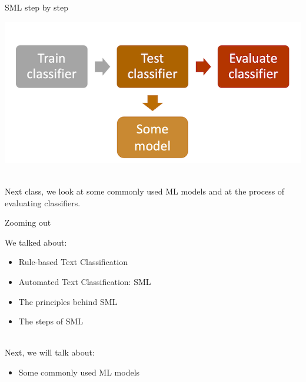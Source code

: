 \documentclass[handout]{beamer}
\begin{document}
	\begin{frame}{SML step by step}
		
		\begin{center}
			\includegraphics[width=\linewidth,height=\textheight,keepaspectratio]{../pictures/MLprocess_model.png} \\\
			
			Next class, we look at some commonly used ML models and at the process of evaluating classifiers.
		\end{center}
		

		
		
		
	\end{frame}
	
	
	\begin{frame}{Zooming out} 
		
We talked about:
		\begin{itemize}
			\item Rule-based Text Classification
			\item Automated Text Classification: SML
			\item The principles behind SML
			\item The steps of SML \\\
		\end{itemize}
		
Next, we will talk about:
		\begin{itemize}
			\item Some commonly used ML models
		\end{itemize}
		
	\end{frame}
\end{document}
